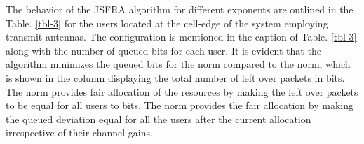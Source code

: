 The behavior of the \ac{JSFRA} algorithm for different exponents  are outlined in the Table. \ref{tbl-3} for the users located at the cell-edge of the system employing  transmit antennas. The configuration is mentioned in the caption of Table. \ref{tbl-3} along with the number of queued bits for each user. It is evident that the algorithm minimizes the queued bits for the  norm compared to the  norm, which is shown in the column displaying the total number of left over packets \me{\chi} in bits. The \me{\ell_{\infty}} norm provides fair allocation of the resources by making the left over packets to be equal for all users to  bits. The \me{\ell_{\infty}} norm provides the fair allocation by making the queued deviation equal for all the users after the current allocation irrespective of their channel gains.

